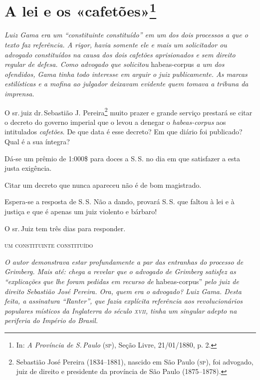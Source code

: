 \chapter{A lei e os «cafetões»\footnote{In: \emph{A Província de S.\,Paulo} (\textsc{sp}), Seção Livre, 21/01/1880, p. 2.}}

\begin{resumo}
\emph{Luiz Gama era um ``constituinte constituído'' em um dos dois
processos a que o texto faz referência. A rigor, havia somente ele e
mais um solicitador ou advogado constituídos na causa dos dois cafetões
aprisionados e sem direito regular de defesa. Como advogado que
solicitou} habeas-corpus \emph{a um dos ofendidos, Gama tinha todo
interesse em arguir o juiz publicamente. As marcas estilísticas e a
mofina ao julgador deixavam evidente quem tomava a tribuna da imprensa.}
\end{resumo}

O sr.\,juiz dr.\,Sebastião J. Pereira\footnote{Sebastião José Pereira \label{sjp}
  (1834--1881), nascido em São Paulo (\textsc{sp}), foi advogado, juiz de direito
  e presidente da província de São Paulo (1875--1878).}
muito prazer e grande
serviço prestará se citar o decreto do governo imperial que o levou a
denegar o \emph{habeas-corpus} aos intitulados \emph{cafetões}. De que
data é esse decreto? Em que diário foi publicado? Qual é a sua íntegra?

Dá-se um prêmio de 1:000\$ para doces a S.\,S. no dia em que satisfazer a
esta justa exigência.

Citar um decreto que nunca apareceu não é de bom magistrado.

Espera-se a resposta de S.\,S. Não a dando, provará S.\,S. que faltou à
lei e à justiça e que é apenas um juiz violento e bárbaro!

O sr.\,Juiz tem três dias para responder.\medskip

\hfill\textsc{um constituinte constituído}


\begin{resumo}
\emph{O autor demonstrava estar profundamente a par das entranhas do
processo de Grimberg. Mais até: chega a revelar que o advogado de
Grimberg satisfez as ``explicações que lhe foram pedidas em recurso de}
habeas-corpus'' \emph{pelo juiz de direito Sebastião José Pereira. Ora,
quem era o advogado? Luiz Gama. Desta feita, a assinatura ``Ranter'', que
fazia explícita referência aos revolucionários populares místicos da
Inglaterra do século \textsc{xvii}, tinha um singular adepto na periferia do
Império do Brasil.}
\end{resumo}

